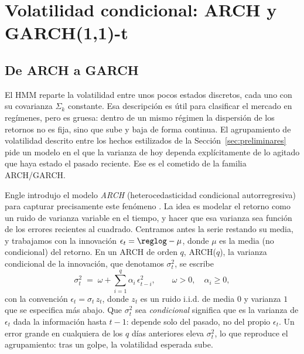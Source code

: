 
\section{Volatilidad condicional: ARCH y GARCH(1,1)-t}
\label{sec:garch}

\subsection{De ARCH a GARCH}
\label{sec:garch-arch}

El HMM reparte la volatilidad entre unos pocos estados discretos, cada uno con su covarianza $\Sigma_k$ constante. Esa descripción es útil para clasificar el mercado en regímenes, pero es gruesa: dentro de un mismo régimen la dispersión de los retornos no es fija, sino que sube y baja de forma continua. El agrupamiento de volatilidad descrito entre los hechos estilizados de la Sección~\ref{sec:preliminares} pide un modelo en el que la varianza de hoy dependa explícitamente de lo agitado que haya estado el pasado reciente. Ese es el cometido de la familia ARCH/GARCH.

Engle introdujo el modelo \emph{ARCH} (heterocedasticidad condicional autorregresiva) para capturar precisamente este fenómeno \cite{engle1982}. La idea es modelar el retorno como un ruido de varianza variable en el tiempo, y hacer que esa varianza sea función de los errores recientes al cuadrado. Centramos antes la serie restando su media, y trabajamos con la innovación $\epsilon_t = \reglog - \mu$, donde $\mu$ es la media (no condicional) del retorno. En un ARCH de orden $q$, ARCH($q$), la varianza condicional de la innovación, que denotamos $\sigma_t^2$, se escribe
\[
\sigma_t^2 \;=\; \omega + \sum_{i=1}^{q} \alpha_i\, \epsilon_{t-i}^2,
\qquad \omega > 0, \quad \alpha_i \ge 0,
\]
con la convención $\epsilon_t = \sigma_t\, z_t$, donde $z_t$ es un ruido i.i.d. de media $0$ y varianza $1$ que se especifica más abajo. Que $\sigma_t^2$ sea \emph{condicional} significa que es la varianza de $\epsilon_t$ dada la información hasta $t-1$: depende solo del pasado, no del propio $\epsilon_t$. Un error grande en cualquiera de los $q$ días anteriores eleva $\sigma_t^2$, lo que reproduce el agrupamiento: tras un golpe, la volatilidad esperada sube.

